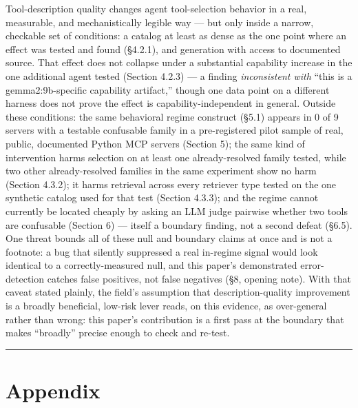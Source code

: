Tool-description quality changes agent tool-selection behavior in a
real, measurable, and mechanistically legible way --- but only inside a
narrow, checkable set of conditions: a catalog at least as dense as the
one point where an effect was tested and found (§4.2.1), and generation
with access to documented source. That effect does not collapse under a
substantial capability increase in the one additional agent tested
(Section 4.2.3) --- a finding \emph{inconsistent with} ``this is a
gemma2:9b-specific capability artifact,'' though one data point on a
different harness does not prove the effect is capability-independent in
general. Outside these conditions: the same behavioral regime construct
(§5.1) appears in 0 of 9 servers with a testable confusable family in a
pre-registered pilot sample of real, public, documented Python MCP
servers (Section 5); the same kind of intervention harms selection on at
least one
already-resolved family tested, while two other already-resolved
families in the same experiment show no harm (Section 4.3.2); it harms
retrieval across every retriever type tested on the one synthetic
catalog used for that test (Section 4.3.3); and the regime cannot
currently be located cheaply by asking an LLM judge pairwise whether two
tools are confusable (Section 6) --- itself a boundary finding, not a
second defeat (§6.5). One threat bounds all of these null and boundary
claims at once and is not a footnote: a bug that silently suppressed a
real in-regime signal would look identical to a correctly-measured null,
and this paper's demonstrated error-detection catches false positives,
not false negatives (§8, opening note). With that caveat stated plainly, the
field's assumption that description-quality improvement is a broadly
beneficial, low-risk lever reads, on this evidence, as over-general
rather than wrong: this paper's contribution is a first pass at the
boundary that makes ``broadly'' precise enough to check and re-test.

\begin{center}\rule{0.5\linewidth}{0.5pt}\end{center}

\hypertarget{appendix}{%
\section{Appendix}\label{appendix}}

